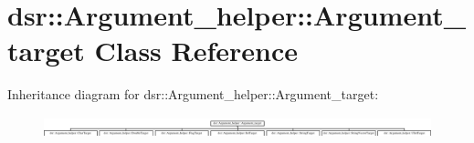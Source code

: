 \hypertarget{classdsr_1_1_argument__helper_1_1_argument__target}{
\section{dsr::Argument\_\-helper::Argument\_\-target Class Reference}
\label{classdsr_1_1_argument__helper_1_1_argument__target}
}
Inheritance diagram for dsr::Argument\_\-helper::Argument\_\-target:\begin{figure}[H]
\begin{center}
\leavevmode
\includegraphics[height=0.629921cm]{classdsr_1_1_argument__helper_1_1_argument__target}
\end{center}
\end{figure}
